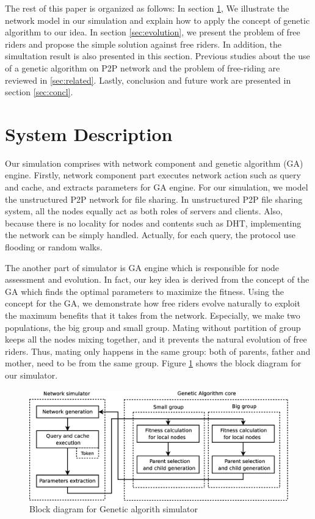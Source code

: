 \documentclass[12pt,journal,draftcls,letterpaper,onecolumn]{IEEEtran}
\begin{document}
The rest of this paper is organized as follows: In section \ref{sec:system}, We illustrate the network model 
in our simulation and explain how to apply the concept of genetic algorithm to our idea. In section \ref{sec:evolution}, 
we present the problem of free riders and propose the simple solution against free riders. In addition,
the simultation result is also presented in this section. Previous studies about the use of a genetic algorithm 
on P2P network and the problem of free-riding are reviewed in \ref{sec:related}. Lastly, conclusion and future work 
are presented in section \ref{sec:concl}.

\section{System Description}\label{sec:system}
Our simulation comprises with network component and genetic algorithm (GA) engine.
Firstly, network component part executes network action such as query and cache, and
extracts parameters for GA engine. For our simulation, we model the unstructured P2P
network for file sharing\cite{ek:survey}. In unstructured P2P file sharing system, all the nodes equally act
as both roles of servers and clients. Also, because there is no locality for nodes and contents
such as DHT, implementing the network can be simply handled. Actually, for each query, the
protocol use flooding or random walks.

The another part of simulator is GA engine which is responsible for node assessment and
evolution. In fact, our key idea is derived from the concept of the GA which finds the optimal
parameters to maximize the fitness\cite{genetic}. Using the concept for the GA, we demonstrate how
free riders evolve naturally to exploit the maximum benefits that it takes from the network.
Especially, we make two populations, the big group and small group. Mating without
partition of group keeps all the nodes mixing together, and it prevents the natural evolution of
free riders. Thus, mating only happens in the same group: both of parents, father and mother,
need to be from the same group. Figure \ref{fig:simblock} shows the block diagram for our simulator.

\begin{figure}
\centering
\includegraphics[width=5.2in]{simblock}
\caption{Block diagram for Genetic algorith simulator} 
\label{fig:simblock}
\end{figure}
\end{document}
